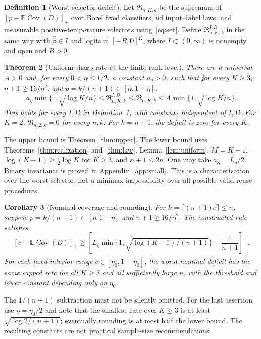\documentclass[10pt]{article}
\newtheorem{theorem}{Theorem}[section]
\newtheorem{corollary}[theorem]{Corollary}
\theoremstyle{definition}\newtheorem{definition}[theorem]{Definition}
\theoremstyle{remark}\newtheorem{remark}[theorem]{Remark}
\newcommand{\E}{\mathbb E}
\newcommand{\1}{\mathbf 1}
\newcommand{\Cov}{\operatorname{Cov}}
\newcommand{\risk}{\mathfrak R}
\newcommand{\pos}[1]{\left[#1\right]_+}
\begin{document}
\begin{definition}[Worst-selector deficit]\label{def:risk}
Let $\risk_{n,K,k}$ be the supremum of $\pos{p-\E\Cov(D)}$ over Borel fixed classifiers, iid input--label laws, and measurable positive-temperature selectors using~\eqref{eq:set}. Define $\risk^{I,B}_{n,K,k}$ in the same way with $\widehat\beta\in I$ and logits in $[-B,0]^K$, where $I\subset(0,\infty)$ is nonempty and open and $B>0$.
\end{definition}
\begin{theorem}[Uniform sharp rate at the finite-rank level]\label{thm:sharp}
There are a universal $A>0$ and, for every $0<\eta\le1/2$, a constant $a_\eta>0$, such that for every $K\ge3$, $n+1\ge16/\eta^2$, and $p=k/(n+1)\in[\eta,1-\eta]$,
\begin{equation}\label{eq:sharp}
 a_\eta\min\{1,\sqrt{\log K/n}\}
 \le\risk^{I,B}_{n,K,k}
 \le\risk_{n,K,k}
 \le A\min\{1,\sqrt{\log K/n}\}.
\end{equation}
This holds for every $I,B$ in Definition~\ref{def:risk}, with constants independent of $I,B$. For $K=2$, $\risk_{n,2,k}=0$ for every $n,k$. For $k=n+1$, the deficit is zero for every $K$.
\end{theorem}
The upper bound is Theorem~\ref{thm:upper}. The lower bound uses Theorems~\ref{thm:realization} and~\ref{thm:law}, Lemma~\ref{lem:uniform}, $M=K-1$, $\log(K-1)\ge\tfrac12\log K$ for $K\ge3$, and $n+1\le2n$. One may take $a_\eta=L_\eta/2$. Binary invariance is proved in Appendix~\ref{app:small}. This is a characterization over the worst selector, not a minimax impossibility over all possible valid reuse procedures.

\begin{corollary}[Nominal coverage and rounding]\label{cor:nominal}
For $k=\lceil(n+1)c\rceil\le n$, suppose $p=k/(n+1)\in[\eta,1-\eta]$ and $n+1\ge16/\eta^2$. The constructed rule satisfies
\begin{equation}\label{eq:rounding}
 \pos{c-\E\Cov(D)}\ge
 \pos{L_\eta\min\{1,\sqrt{\log(K-1)/(n+1)}\}-\frac1{n+1}}.
\end{equation}
For each fixed interior range $c\in[\eta_0,1-\eta_0]$, the worst nominal deficit has the same capped rate for all $K\ge3$ and all sufficiently large $n$, with the threshold and lower constant depending only on $\eta_0$.
\end{corollary}
The $1/(n+1)$ subtraction must not be silently omitted. For the last assertion use $\eta=\eta_0/2$ and note that the smallest rate over $K\ge3$ is at least $\sqrt{\log2/(n+1)}$; eventually rounding is at most half the lower bound. The resulting constants are not practical sample-size recommendations.
\end{document}
